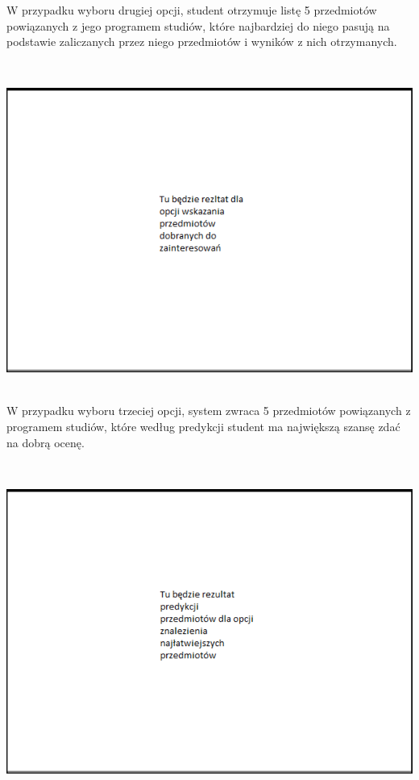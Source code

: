 \documentclass[licencjacka]{pracamgr}
\begin{document}
W przypadku wyboru drugiej opcji, student otrzymuje listę 5 przedmiotów powiązanych z jego programem studiów, które najbardziej do niego pasują na podstawie zaliczanych przez niego przedmiotów i wyników z nich otrzymanych. \par
 ~\\
\begin{minipage}{\linewidth} 
	\centering
           \includegraphics[scale=0.7]{bestprzedzainteresowania.png}
\end{minipage} \\ 

 W przypadku wyboru trzeciej opcji, system zwraca 5 przedmiotów powiązanych z programem studiów, które według predykcji student ma największą szansę zdać na dobrą ocenę. \par
 ~\\
\begin{minipage}{\linewidth}
	\centering
           \includegraphics[scale=0.7]{bestprzedeasy.png}
\end{minipage} \\ 
\end{document}
